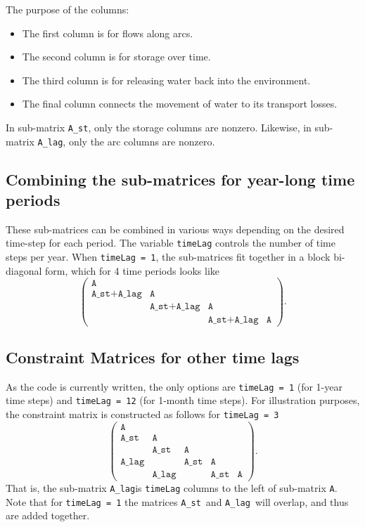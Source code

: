 \documentclass[11pt]{article}
\newcommand{\A}{\texttt{A}}
\newcommand{\Ast}{\texttt{A\_st}}
\newcommand{\Alag}{\texttt{A\_lag}}
\begin{document}
The purpose of the columns:
\begin{itemize}
	\item The first column is for flows along arcs.
	\item The second column is for storage over time.
	\item The third column is for releasing water back into the environment.
	\item The final column connects the movement of water to its transport losses.
\end{itemize}

In sub-matrix \Ast, only the storage columns are nonzero.
Likewise, in sub-matrix \Alag, only the arc columns are nonzero.

\subsection{Combining the sub-matrices for year-long time periods}
\label{ssec:yearlag}

These sub-matrices can be combined in various ways depending on the desired time-step for each period.
The variable \texttt{timeLag} controls the number of time steps per year.
When \texttt{timeLag = 1}, the sub-matrices fit together in a block bi-diagonal form, which for 4 time periods looks like
\[
	\left(
	\begin{array}{cccc}
		\A         &            &            &    \\
		\Ast+\Alag & \A         &            &    \\
					  & \Ast+\Alag & \A         &    \\
					  &            & \Ast+\Alag & \A 
	\end{array}
	\right).
\]

\subsection{Constraint Matrices for other time lags}
\label{ssec:otherlag}

As the code is currently written, the only options are \texttt{timeLag = 1} (for 1-year time steps) and \texttt{timeLag = 12} (for 1-month time steps).
For illustration purposes, the constraint matrix is constructed as follows for \texttt{timeLag = 3}
\[
	\left(
	\begin{array}{ccccc}
		\A    &       &      &      &    \\
		\Ast  & \A    &      &      &    \\
		      & \Ast  & \A   &      &    \\
		\Alag &       & \Ast & \A   &    \\
		      & \Alag &      & \Ast & \A
	\end{array}
	\right).
\]
That is, the sub-matrix \Alag is \texttt{timeLag} columns to the left of sub-matrix \A.
Note that for \texttt{timeLag = 1} the matrices \Ast\ and \Alag\ will overlap, and thus are added together.
\end{document}
